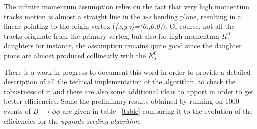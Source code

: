 \documentclass[paper=a4, fontsize=10pt]{scrartcl}
\numberwithin{equation}{section}		%
\numberwithin{figure}{section}			%
\numberwithin{table}{section}				%
\begin{document}
The infinite momentum assumption relies on the fact that very high momentum tracks motion is almost a straight line in the \textit{x-z} bending plane, resulting in a linear pointing to the origin vertex (\textit{(x,y,z)=(0,,0,0)}). Of course, not all the tracks originate from the primary vertex, but also for high momentum $K_s^{0}$ daughters for instance, the assumption remains quite good since the daughter pions are almost produced collinearly with the $K_{s}^{0}$. 

There is a work in progress to document this word in order to provide a detailed description of all the techical implementation of the algorithm, to check the robustness of it and there are also some additional ideas to apport in order to get better efficiencies. Some the preliminary results obtained by running on 1000 events of $B_s \rightarrow \phi \phi$ are given in table ~\ref{table} comparing it to the evolution of the efficiencies for the \textit{upgrade seeding algorithm}.
\end{document}
